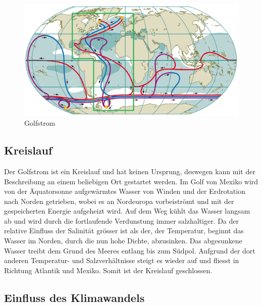 \begin{figure}
	\includegraphics[width=12cm]{thermohalin/Bilder/Deep-Ocean-Currents2.jpg}
	\centering
	\caption{Golfstrom\label{thermohalin:Deep-Ocean-Currents}}
\end{figure}



\subsection{Kreislauf}

Der Golfstrom ist ein Kreislauf und hat keinen Ursprung, deswegen kann mit der Beschreibung an einem beliebigen Ort gestartet werden. Im Golf von Mexiko wird von der Äquatorsonne aufgewärmtes Wasser von Winden und der Erdrotation nach Norden getrieben, wobei es an Nordeuropa vorbeiströmt und mit der gespeicherten Energie aufgeheizt wird.
Auf dem Weg kühlt das Wasser langsam ab und wird durch die fortlaufende Verdunstung immer salzhaltiger. Da der relative Einfluss der Salinität grösser ist als der, der Temperatur, beginnt das Wasser im Norden, durch die nun hohe Dichte, abzusinken. Das abgesunkene Wasser treibt dem Grund des Meeres entlang bis zum Südpol. Aufgrund der dort anderen Temperatur- und Salzverhältnisse steigt es wieder auf und fliesst in Richtung Atlantik und Mexiko. Somit ist der Kreislauf geschlossen.

\subsection{Einfluss des Klimawandels}\label{thermohalin:EinflussKlimawandel}

